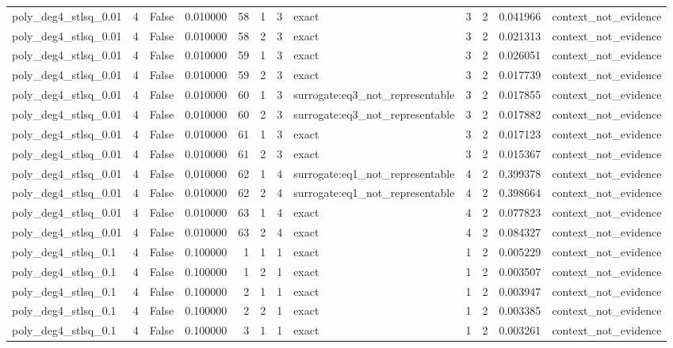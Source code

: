 \begin{tabular}{lrrrrrrlrrrl}
poly\_deg4\_stlsq\_0.01 & 4 & False & 0.010000 & 58 & 1 & 3 & exact & 3 & 2 & 0.041966 & context\_not\_evidence \\
poly\_deg4\_stlsq\_0.01 & 4 & False & 0.010000 & 58 & 2 & 3 & exact & 3 & 2 & 0.021313 & context\_not\_evidence \\
poly\_deg4\_stlsq\_0.01 & 4 & False & 0.010000 & 59 & 1 & 3 & exact & 3 & 2 & 0.026051 & context\_not\_evidence \\
poly\_deg4\_stlsq\_0.01 & 4 & False & 0.010000 & 59 & 2 & 3 & exact & 3 & 2 & 0.017739 & context\_not\_evidence \\
poly\_deg4\_stlsq\_0.01 & 4 & False & 0.010000 & 60 & 1 & 3 & surrogate:eq3\_not\_representable & 3 & 2 & 0.017855 & context\_not\_evidence \\
poly\_deg4\_stlsq\_0.01 & 4 & False & 0.010000 & 60 & 2 & 3 & surrogate:eq3\_not\_representable & 3 & 2 & 0.017882 & context\_not\_evidence \\
poly\_deg4\_stlsq\_0.01 & 4 & False & 0.010000 & 61 & 1 & 3 & exact & 3 & 2 & 0.017123 & context\_not\_evidence \\
poly\_deg4\_stlsq\_0.01 & 4 & False & 0.010000 & 61 & 2 & 3 & exact & 3 & 2 & 0.015367 & context\_not\_evidence \\
poly\_deg4\_stlsq\_0.01 & 4 & False & 0.010000 & 62 & 1 & 4 & surrogate:eq1\_not\_representable & 4 & 2 & 0.399378 & context\_not\_evidence \\
poly\_deg4\_stlsq\_0.01 & 4 & False & 0.010000 & 62 & 2 & 4 & surrogate:eq1\_not\_representable & 4 & 2 & 0.398664 & context\_not\_evidence \\
poly\_deg4\_stlsq\_0.01 & 4 & False & 0.010000 & 63 & 1 & 4 & exact & 4 & 2 & 0.077823 & context\_not\_evidence \\
poly\_deg4\_stlsq\_0.01 & 4 & False & 0.010000 & 63 & 2 & 4 & exact & 4 & 2 & 0.084327 & context\_not\_evidence \\
poly\_deg4\_stlsq\_0.1 & 4 & False & 0.100000 & 1 & 1 & 1 & exact & 1 & 2 & 0.005229 & context\_not\_evidence \\
poly\_deg4\_stlsq\_0.1 & 4 & False & 0.100000 & 1 & 2 & 1 & exact & 1 & 2 & 0.003507 & context\_not\_evidence \\
poly\_deg4\_stlsq\_0.1 & 4 & False & 0.100000 & 2 & 1 & 1 & exact & 1 & 2 & 0.003947 & context\_not\_evidence \\
poly\_deg4\_stlsq\_0.1 & 4 & False & 0.100000 & 2 & 2 & 1 & exact & 1 & 2 & 0.003385 & context\_not\_evidence \\
poly\_deg4\_stlsq\_0.1 & 4 & False & 0.100000 & 3 & 1 & 1 & exact & 1 & 2 & 0.003261 & context\_not\_evidence \\

\end{tabular}

